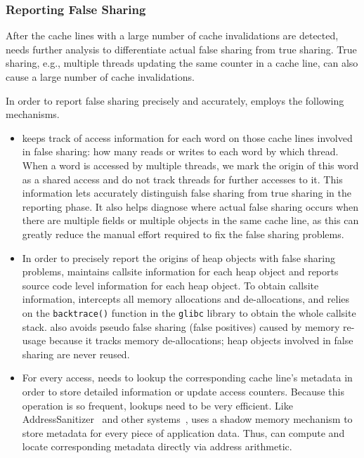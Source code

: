 \subsubsection{Reporting False Sharing}

After the cache lines with a large number of cache invalidations are detected,
\Predator{} needs further analysis to differentiate actual false sharing from true sharing. 
True sharing, e.g., multiple threads updating the same counter in a
cache line, can also cause a large number of cache invalidations.

In order to report false sharing precisely and accurately,  
\Predator{} employs the following mechanisms. 

\begin{itemize}
\item

\Predator{} keeps track of access information for each word on those
cache lines involved in false sharing: how many reads or writes to
each word by which thread.  When a word is accessed by multiple
threads, we mark the origin of this word as a shared access and do not
track threads for further accesses to it. This information
lets \Predator{} accurately distinguish false sharing from true
sharing in the reporting phase.  It also helps diagnose where
actual false sharing occurs when there are multiple fields or multiple
objects in the same cache line, as this can greatly reduce the manual
effort required to fix the false sharing problems.

\item
In order to precisely report the origins of heap objects with false
sharing problems, \Predator{} maintains callsite information for each heap
object and reports source code level information for each heap
object. To obtain callsite information, \Predator{} intercepts all
memory allocations and de-allocations, and relies
on the \texttt{backtrace()} function in the \texttt{glibc} library to obtain
the whole callsite stack.
\Predator{} also avoids pseudo false sharing (false positives) caused by memory re-usage 
because it tracks memory de-allocations; heap objects involved in false 
sharing are never reused.

\item
For every access, \Predator{} needs to lookup the corresponding cache line's metadata 
in order to store detailed information or update access counters. Because this operation is so frequent,
 lookups need to be very efficient.
Like 
AddressSanitizer~\cite{Addresssanitizer} and other systems~\cite{qinzhaodetection,Valgrind},
\Predator{} uses a shadow memory mechanism to store metadata for every piece of application data. 
Thus, \Predator{} can compute and locate corresponding metadata directly via address arithmetic.


\end{itemize}
